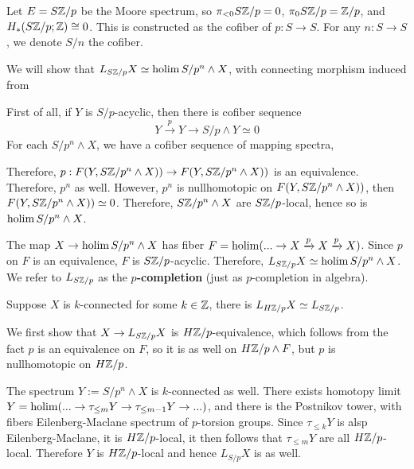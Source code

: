 \begin{example}
    Let $E=S\mathbb{Z}/p$ be the Moore spectrum, so $\pi_{<0}S\mathbb{Z}/p=0$, $\pi_0S\mathbb{Z}/p= \mathbb{Z}/p$, and $H_*(S\mathbb{Z}/p; \mathbb{Z})\cong 0$. This is constructed as the cofiber of $p: S\to S$. For any $n: S\to S$, we denote $S/n$ the cofiber.

    We will show that $L_{S\mathbb{Z}/p} X\simeq \operatorname{holim} S/p^n\wedge X$, with connecting morphism induced from 
    \begin{center}
    \end{center}
    First of all, if $Y$ is $S/p$-acyclic, then there is cofiber sequence 
\[
Y\xrightarrow{p}Y\to S/p\wedge Y\simeq 0
\]
For each $S/p^n\wedge X$, we have a cofiber sequence of mapping spectra,
\begin{center}
\end{center}Therefore, $p:F(Y, S\mathbb{Z}/p^n \wedge X))\to F(Y, S\mathbb{Z}/p^n \wedge X))$ is an equivalence. Therefore, $p^n$ as well. However, $p^n$ is nullhomotopic on $F(Y, S\mathbb{Z}/p^n \wedge X))$, then $F(Y, S\mathbb{Z}/p^n \wedge X))\simeq 0$. Therefore, $S\mathbb{Z}/p^n \wedge X$ are $S\mathbb{Z}/p$-local, hence so is $\operatorname{holim} S/p^n\wedge X$.

    The map $X\to \operatorname{holim} S/p^n\wedge X$ has fiber $F=\operatorname{holim}(...\to X\xrightarrow{p}X \xrightarrow{p} X)$. Since $p$ on $F$ is an equivalence, $F$ is $S\mathbb{Z}/p$-acyclic. Therefore, $L_{S\mathbb{Z}/p} X\simeq \operatorname{holim} S/p^n\wedge X$. We refer to $L_{S\mathbb{Z}/p}$ as the \textbf{$p$-completion} (just as $p$-completion in algebra).

\end{example}
\begin{example}
 Suppose $X$ is $k$-connected for some $k\in \mathbb{Z}$, there is $L_{H\mathbb{Z}/p} X\simeq L_{S\mathbb{Z}/p}$.

    We first show that $X\to L_{S\mathbb{Z}/p} X$ is $H\mathbb{Z}/p$-equivalence, which follows from the fact $p$ is an equivalence on $F$, so it is as well on $H\mathbb{Z}/p\wedge F$, but $p$ is nullhomotopic on $H\mathbb{Z}/p$.

    The spectrum $Y:=S/p^n \wedge X$ is $k$-connected as well. There exists homotopy limit $Y=\operatorname{holim}(...\to \tau_{\leq m}Y\to \tau_{\leq m-1}Y\to ...)$, and there is the Postnikov tower, with fibers Eilenberg-Maclane spectrum of $p$-torsion groups. Since $\tau_{\leq k}Y$ is alsp Eilenberg-Maclane, it is $H\mathbb{Z}/p$-local, it then follows that $\tau_{\leq m}Y$ are all $H\mathbb{Z}/p$-local. Therefore $Y$ is $H\mathbb{Z}/p$-local and hence $L_{S/p}X$ is as well.
\end{example}

